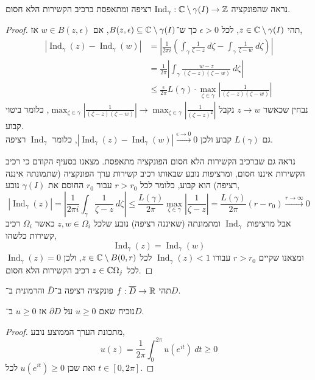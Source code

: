 \subquestion{}
נראה שהפונקציה $\operatorname{Ind}_\gamma : \mathbb{C} \setminus \gamma(I) \to \mathbb{Z}$ רציפה ומתאפסת ברכיב הקשירות הלא חסום.
\begin{proof}
	תהי $z \in \mathbb{C} \setminus \gamma(I)$, לכל $\epsilon > 0$ כך ש־$B(z, \epsilon) \subseteq \mathbb{C} \setminus \gamma(I)$, אם $w \in B(z, \epsilon)$ אז,
	\begin{align*}
		|\operatorname{Ind}_\gamma(z) - \operatorname{Ind}_\gamma(w)|
		& = \left\lvert \frac{1}{2\pi i} \left( \int_\gamma \frac{1}{\zeta - z}\ d\zeta - \int_\gamma \frac{1}{\zeta - w}\ d\zeta \right) \right\rvert \\
		& = \frac{1}{2\pi} \left\lvert \int_\gamma \frac{w - z}{(\zeta - z)(\zeta - w)}\ d\zeta \right\rvert \\
		& \le \frac{\epsilon}{2\pi} L(\gamma) \cdot \max_{\zeta \in \gamma} \left\lvert \frac{1}{(\zeta - z)(\zeta - w)} \right\rvert
	\end{align*}
	נבחין שכאשר $z \to w$ נקבל $\max_{\zeta \in \gamma} \left\lvert \frac{1}{(\zeta - z)(\zeta - w)} \right\rvert \to \max_{\zeta \in \gamma} \left\lvert \frac{1}{{(\zeta - z)}^2} \right\rvert$, כלומר ביטוי קבוע. \\
	גם $L(\gamma)$ קבוע ולכן $|\operatorname{Ind}_\gamma(z) - \operatorname{Ind}_\gamma(w)| \xrightarrow{\epsilon \to 0} 0$, כלומר $\operatorname{Ind}_\gamma$ רציפה.

	נראה גם שברכיב הקשירות הלא חסום הפונקציה מתאפסת.
	מצאנו בסעיף הקודם כי רכיב הקשירות איננו חסום, ומרציפות נובע שבאותו רכיב קשירות ערך הפונקציה (שתמונתה איננה רציפה) הוא קבוע, כלומר לכל $r > r_0$ עבור $r_0$ החוסם את $\gamma(I)$ נובע,
	\[
		|\operatorname{Ind}_\gamma(z)|
		= \left\lvert \frac{1}{2\pi i} \int_\gamma \frac{1}{\zeta - z}\ d\zeta \right\rvert
		\le \frac{L(\gamma)}{2\pi} \max_{\zeta \in \gamma} \left\lvert \frac{1}{\zeta - z} \right\rvert
		= \frac{L(\gamma)}{2\pi} (r - r_0)
		\xrightarrow{r \to \infty} 0
	\]
	אבל מרציפות $\operatorname{Ind}_\gamma$ ומתמונתה (שאיננה רציפה) נובע שלכל $z, w \in \Omega_i$ כאשר $\Omega_i$ רכיב קשירות כלשהו,
	\[
		\operatorname{Ind}_\gamma(z) = \operatorname{Ind}_\gamma(w)
	\]
	ומצאנו שקיים $r > r_0$ עבורו $\operatorname{Ind}_\gamma(z) < 1$ לכל $z \in \mathbb{C} \setminus B(0, r)$, ולכן $\operatorname{Ind}_\gamma(z) = 0$ לכל $z \in \mathbb{C} \Omega_j$ רכיב הקשירות הלא חסום.
\end{proof}

\question{}
תהי $f : \overline{D} \to \mathbb{R}$ פונקציה רציפה ב־$\overline{D}$ והרמונית ב־$D$.

\subquestion{}
נוכיח שאם $u \ge 0$ על $\partial D$ אז $u \ge 0$ ב־$D$.
\begin{proof}
	מתכונת הערך הממוצע נובע,
	\[
		u(z)
		= \frac{1}{2\pi} \int_0^{2\pi} u(e^{it})\ dt
		\ge 0
	\]
	זאת שכן $u(e^{it}) \ge 0$ לכל $t \in [0, 2\pi]$.
\end{proof}

